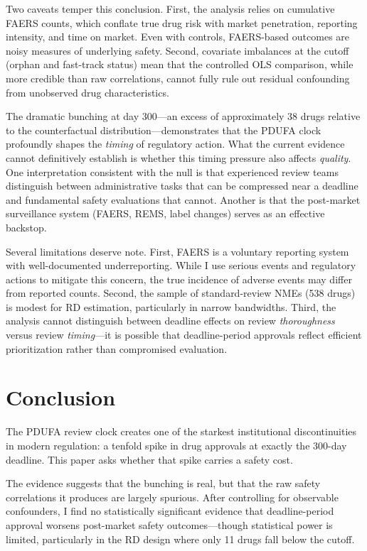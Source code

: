 \documentclass[12pt]{article}
\begin{document}
Two caveats temper this conclusion. First, the analysis relies on cumulative FAERS counts, which conflate true drug risk with market penetration, reporting intensity, and time on market. Even with controls, FAERS-based outcomes are noisy measures of underlying safety. Second, covariate imbalances at the cutoff (orphan and fast-track status) mean that the controlled OLS comparison, while more credible than raw correlations, cannot fully rule out residual confounding from unobserved drug characteristics.

The dramatic bunching at day 300---an excess of approximately 38 drugs relative to the counterfactual distribution---demonstrates that the PDUFA clock profoundly shapes the \textit{timing} of regulatory action. What the current evidence cannot definitively establish is whether this timing pressure also affects \textit{quality}. One interpretation consistent with the null is that experienced review teams distinguish between administrative tasks that can be compressed near a deadline and fundamental safety evaluations that cannot. Another is that the post-market surveillance system (FAERS, REMS, label changes) serves as an effective backstop.

Several limitations deserve note. First, FAERS is a voluntary reporting system with well-documented underreporting. While I use serious events and regulatory actions to mitigate this concern, the true incidence of adverse events may differ from reported counts. Second, the sample of standard-review NMEs (538 drugs) is modest for RD estimation, particularly in narrow bandwidths. Third, the analysis cannot distinguish between deadline effects on review \textit{thoroughness} versus review \textit{timing}---it is possible that deadline-period approvals reflect efficient prioritization rather than compromised evaluation.

\section{Conclusion}

The PDUFA review clock creates one of the starkest institutional discontinuities in modern regulation: a tenfold spike in drug approvals at exactly the 300-day deadline. This paper asks whether that spike carries a safety cost.

The evidence suggests that the bunching is real, but that the raw safety correlations it produces are largely spurious. After controlling for observable confounders, I find no statistically significant evidence that deadline-period approval worsens post-market safety outcomes---though statistical power is limited, particularly in the RD design where only 11 drugs fall below the cutoff.
\end{document}
